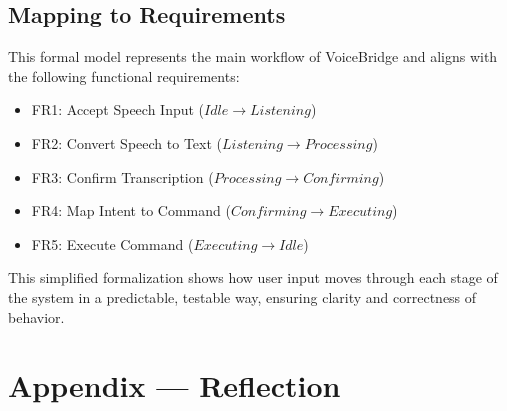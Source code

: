 \documentclass[11pt]{article}
\begin{document}
\subsection{Mapping to Requirements}

This formal model represents the main workflow of VoiceBridge and aligns with the following functional requirements:

\begin{itemize}
    \item FR1: Accept Speech Input ($Idle \rightarrow Listening$)
    \item FR2: Convert Speech to Text ($Listening \rightarrow Processing$)
    \item FR3: Confirm Transcription ($Processing \rightarrow Confirming$)
    \item FR4: Map Intent to Command ($Confirming \rightarrow Executing$)
    \item FR5: Execute Command ($Executing \rightarrow Idle$)
\end{itemize}

This simplified formalization shows how user input moves through each stage of the system in a predictable, testable way, ensuring clarity and correctness of behavior.




\newpage{}
\section*{Appendix --- Reflection}




\end{document}
